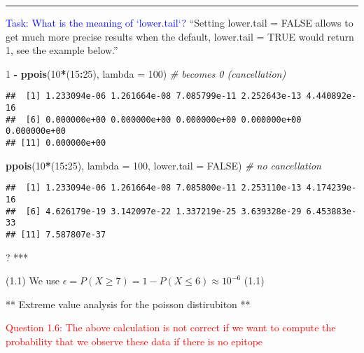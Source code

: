\documentclass[]{article}
\newenvironment{Shaded}{\begin{snugshade}}{\end{snugshade}}
\newcommand{\KeywordTok}[1]{\textcolor[rgb]{0.13,0.29,0.53}{\textbf{#1}}}
\newcommand{\DataTypeTok}[1]{\textcolor[rgb]{0.13,0.29,0.53}{#1}}
\newcommand{\DecValTok}[1]{\textcolor[rgb]{0.00,0.00,0.81}{#1}}
\newcommand{\StringTok}[1]{\textcolor[rgb]{0.31,0.60,0.02}{#1}}
\newcommand{\CommentTok}[1]{\textcolor[rgb]{0.56,0.35,0.01}{\textit{#1}}}
\newcommand{\OtherTok}[1]{\textcolor[rgb]{0.56,0.35,0.01}{#1}}
\newcommand{\OperatorTok}[1]{\textcolor[rgb]{0.81,0.36,0.00}{\textbf{#1}}}
\newcommand{\NormalTok}[1]{#1}
\let\oldrule=\rule
\renewcommand{\rule}[1]{\oldrule{\linewidth}}
\begin{document}
\begin{center}\rule{0.5\linewidth}{\linethickness}\end{center}

\textcolor{blue}{Task: What is the meaning of `lower.tail`?} ``Setting
lower.tail = FALSE allows to get much more precise results when the
default, lower.tail = TRUE would return 1, see the example below.''

\begin{Shaded}
\begin{Highlighting}[]
\DecValTok{1} \OperatorTok{-}\StringTok{ }\KeywordTok{ppois}\NormalTok{(}\DecValTok{10}\OperatorTok{*}\NormalTok{(}\DecValTok{15}\OperatorTok{:}\DecValTok{25}\NormalTok{), }\DataTypeTok{lambda =} \DecValTok{100}\NormalTok{)  }\CommentTok{# becomes 0 (cancellation)}
\end{Highlighting}
\end{Shaded}

\begin{verbatim}
##  [1] 1.233094e-06 1.261664e-08 7.085799e-11 2.252643e-13 4.440892e-16
##  [6] 0.000000e+00 0.000000e+00 0.000000e+00 0.000000e+00 0.000000e+00
## [11] 0.000000e+00
\end{verbatim}

\begin{Shaded}
\begin{Highlighting}[]
\KeywordTok{ppois}\NormalTok{(}\DecValTok{10}\OperatorTok{*}\NormalTok{(}\DecValTok{15}\OperatorTok{:}\DecValTok{25}\NormalTok{), }\DataTypeTok{lambda =} \DecValTok{100}\NormalTok{, }\DataTypeTok{lower.tail =} \OtherTok{FALSE}\NormalTok{)  }\CommentTok{# no cancellation}
\end{Highlighting}
\end{Shaded}

\begin{verbatim}
##  [1] 1.233094e-06 1.261664e-08 7.085800e-11 2.253110e-13 4.174239e-16
##  [6] 4.626179e-19 3.142097e-22 1.337219e-25 3.639328e-29 6.453883e-33
## [11] 7.587807e-37
\end{verbatim}

? ***

(1.1) We use
\(\epsilon = P(X \geq 7) = 1 - P(X \leq 6) \approx 10^{-6}\) (1.1)

** Extreme value analysis for the poisson distirubiton **

\textcolor{red}{Question 1.6: The above calculation is not correct if we want to compute the probability that we observe these data if there is no epitope}
\end{document}
